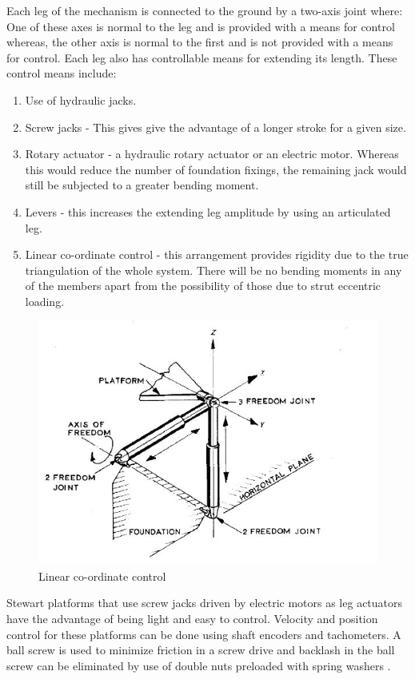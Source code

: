 Each leg of the mechanism is connected to the ground by a two-axis joint where: One of these axes is
normal to the leg and is provided with a means for control whereas, the other axis is normal to the first and is not provided with a means for control.
Each leg also has controllable means for extending its length. These control means include:
\begin{enumerate}
\item Use of hydraulic jacks.
\item Screw jacks - This gives give the advantage of
a longer stroke for a given size.
\item Rotary actuator - a hydraulic rotary actuator or an electric motor. Whereas this would reduce the number of foundation fixings, the remaining jack would still be subjected to a greater bending moment.
\item Levers - this increases the extending leg amplitude by using an articulated leg.
\item Linear co-ordinate control - this arrangement provides rigidity due to the true triangulation of
the whole system. There will be no bending moments in any of the members apart from the possibility of those due to strut eccentric loading. 
\end{enumerate}
\begin{center}
	\begin{figure}[!h]
	\centering
	\includegraphics[width=0.6\linewidth]{Figures/Fig11}
	\caption{Linear co-ordinate control}
	\end{figure}
\end{center}

Stewart platforms that use screw jacks driven by electric motors as leg actuators have the advantage of being light and easy to control. Velocity and position control for these platforms can be done using shaft encoders and tachometers. A ball screw is used to minimize friction in a screw drive and backlash in the ball screw can be eliminated by use of double nuts preloaded with spring washers \cite{fichter1986stewart}.

